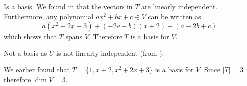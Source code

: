 \begin{questions}
\begin{partquestions}{\alph*}
        \item Is a basis. We found in  that the vectors in $T$ are linearly independent. Furthermore, any polynomial $ax^2 + bx + c \in V$ can be written as
        \[
            a(x^2+2x+3) + (-2a+b)(x+2) + (a-2b+c)
        \]
        which shows that $T$ spans $V$. Therefore $T$ is a basis for $V$.

        \item Not a basis as $U$ is not linearly independent (from ).
    \end{partquestions}

    \item We earlier found that $T = \{1, x + 2, x^2 + 2x + 3\}$ is a basis for $V$. Since $|T| = 3$ therefore $\dim{V} = 3$.
\end{questions}

